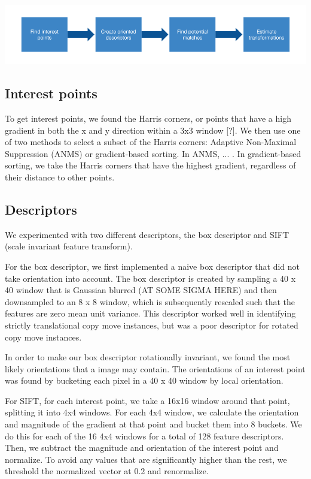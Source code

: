 \documentclass[12pt]{article}
\begin{document}
\includegraphics[width=1.0\linewidth]{./gfx/cm_pipeline.png}

\subsection*{Interest points}
To get interest points, we found the Harris corners, or points that have a high gradient in both the x and y direction within a 3x3 window [?]. We then use one of two methods to select a subset of the Harris corners: Adaptive Non-Maximal Suppression (ANMS) or gradient-based sorting. In ANMS, ... . In gradient-based sorting, we take the Harris corners that have the highest gradient, regardless of their distance to other points. 

\subsection*{Descriptors}
We experimented with two different descriptors, the box descriptor and SIFT (scale invariant feature transform).

For the box descriptor, we first implemented a naive box descriptor that did not take orientation into account. The box descriptor is created by sampling a 40 x 40 window that is Gaussian blurred (AT SOME SIGMA HERE) and then downsampled to an 8 x 8 window, which is subsequently rescaled such that the features are zero mean unit variance. This descriptor worked well in identifying strictly translational copy move instances, but was a poor descriptor for rotated copy move instances.

In order to make our box descriptor rotationally invariant, we found the most likely orientations that a image may contain. The orientations of an interest point was found by bucketing each pixel in a 40 x 40 window by local orientation.

For SIFT, for each interest point, we take a 16x16 window around that point, splitting it into 4x4 windows. For each 4x4 window, we calculate the orientation and magnitude of the gradient at that point and bucket them into 8 buckets. We do this for each of the 16 4x4 windows for a total of 128 feature descriptors. Then, we subtract the magnitude and orientation of the interest point and normalize. To avoid any values that are significantly higher than the rest, we threshold the normalized vector at 0.2 and renormalize.
\end{document}
